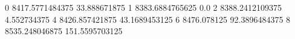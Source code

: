 0 8417.5771484375 33.888671875
1 8383.6884765625 0.0
2 8388.2412109375 4.552734375
4 8426.857421875 43.1689453125
6 8476.078125 92.3896484375
8 8535.248046875 151.5595703125
